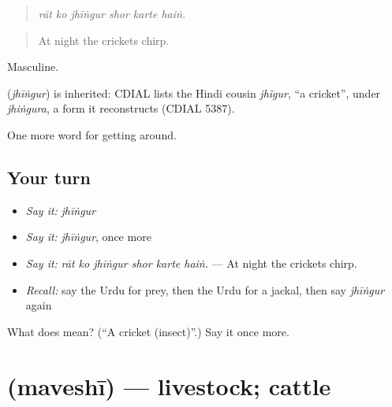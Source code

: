 \begin{quote}
     
\end{quote}

\begin{quote}
\emph{rāt ko jhīṅgur shor karte haiṅ.}
\end{quote}

\begin{quote}
At night the crickets chirp.
\end{quote}

Masculine.

\begin{cousinweb}
\textbf{} (\emph{jhīṅgur}) is inherited: CDIAL lists the Hindi cousin \emph{jhĩgur}, \textquotedblleft{}a cricket\textquotedblright{}, under \emph{jhiṅgura}, a form it reconstructs (CDIAL 5387).
\end{cousinweb}

\begin{grammarlens}[title={What you've built}]
One more word for getting around.
\end{grammarlens}

\subsection*{Your turn}
\begin{itemize}
\raggedright
  \item \emph{Say it:} \emph{jhīṅgur}
  \item \emph{Say it:} \emph{jhīṅgur}, once more
  \item \emph{Say it:} \emph{rāt ko jhīṅgur shor karte haiṅ.} — At night the crickets chirp.
  \item \emph{Recall:} say the Urdu for prey, then the Urdu for a jackal, then say \emph{jhīṅgur} again
\end{itemize}

\begin{tcolorbox}[breakable,colback=teal!4,colframe=teal!35!black,title={Before you move on}]
What does  mean? (\textquotedblleft{}A cricket (insect)\textquotedblright{}.) Say it once more.
\end{tcolorbox}
\section[\texorpdfstring{\ur{مویشی} (maveshī)}{مویشی (maveshī)}]{ (maveshī) — livestock; cattle}

\label{lesson:UR-C439-maveshi}



